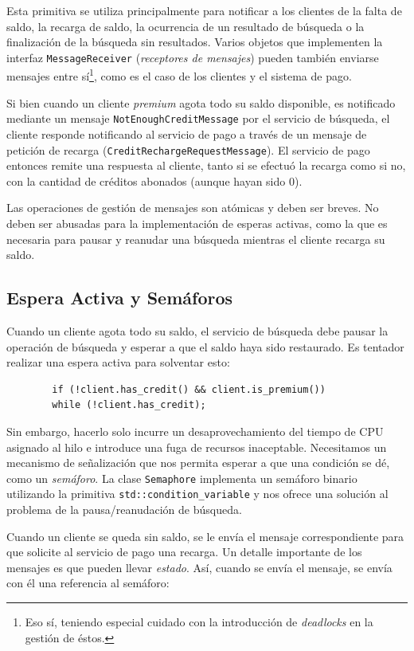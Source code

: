 \documentclass[a4paper]{article}
\begin{document}
	Esta primitiva se utiliza principalmente para notificar a los clientes de la falta de saldo, la recarga de saldo, la ocurrencia de un resultado de búsqueda o la finalización de la búsqueda sin resultados. Varios objetos que implementen la interfaz \texttt{MessageReceiver} (\textit{receptores de mensajes}) pueden también enviarse mensajes entre sí\footnote{Eso sí, teniendo especial cuidado con la introducción de \textit{deadlocks} en la gestión de éstos.}, como es el caso de los clientes y el sistema de pago.
	
	Si bien cuando un cliente \textit{premium} agota todo su saldo disponible, es notificado mediante un mensaje \texttt{NotEnoughCreditMessage} por el servicio de búsqueda, el cliente responde notificando al servicio de pago a través de un mensaje de petición de recarga (\texttt{CreditRechargeRequestMessage}). El servicio de pago entonces remite una respuesta al cliente, tanto si se efectuó la recarga como si no, con la cantidad de créditos abonados (aunque hayan sido $0$).
	
	Las operaciones de gestión de mensajes son atómicas y deben ser breves. No deben ser abusadas para la implementación de esperas activas, como la que es necesaria para pausar y reanudar una búsqueda mientras el cliente recarga su saldo.
	
	\subsection{Espera Activa y Semáforos}
	Cuando un cliente agota todo su saldo, el servicio de búsqueda debe pausar la operación de búsqueda y esperar a que el saldo haya sido restaurado. Es tentador realizar una espera activa para solventar esto:
	
	\begin{verbatim}
		if (!client.has_credit() && client.is_premium())
		while (!client.has_credit);
	\end{verbatim}
	
	Sin embargo, hacerlo solo incurre un desaprovechamiento del tiempo de CPU asignado al hilo e introduce una fuga de recursos inaceptable. Necesitamos un mecanismo de señalización que nos permita esperar a que una condición se dé, como un \textit{semáforo}. La clase \texttt{Semaphore} implementa un semáforo binario utilizando la primitiva \texttt{std::condition\_variable} y nos ofrece una solución al problema de la pausa/reanudación de búsqueda.
	
	Cuando un cliente se queda sin saldo, se le envía el mensaje correspondiente para que solicite al servicio de pago una recarga. Un detalle importante de los mensajes es que pueden llevar \textit{estado}. Así, cuando se envía el mensaje, se envía con él una referencia al semáforo:
	
\end{document}
